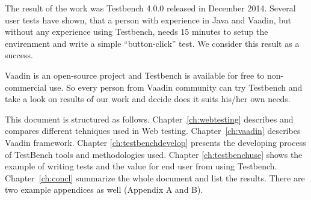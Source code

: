 	  The result of the work was Testbench 4.0.0 released in December 2014.
	  Several user tests have shown, that a person with experience in Java and
	  Vaadin, but without any experience using Testbench, needs 15 minutes to setup
	  the envirenment and write a simple ``button-click'' test. We consider this
	  result as a success.
	  
	  Vaadin is an open-source project and Testbench is available for free to
	  non-commercial use.  So every person from Vaadin community can try Testbench and take a look on results of our work and
	   decide does it suits his/her own needs.
	  
	  \iffalse
		  I will also , because Testbench is focused on testing web
		 applications written with Vaadin. I will also describe the working flow, what
		 tools and methodologies the team used and how the final product helps
		 Vaadin developers.
	  \fi
	  
	  This document is structured as follows. Chapter~\ref{ch:webtesting} describes
	  and compares different tehniques used in Web testing. Chapter~\ref{ch:vaadin} describes Vaadin framework.
	  Chapter \ref{ch:testbenchdevelop} presents the developing process of TestBench tools and methodologies used. Chapter
	  \ref{ch:testbenchuse} shows the example of writing tests and the value for
	  end user from using Testbench. Chapter~\ref{ch:concl} summarize the whole
	  document and list the results. There are two example appendices as well (Appendix A and B).
